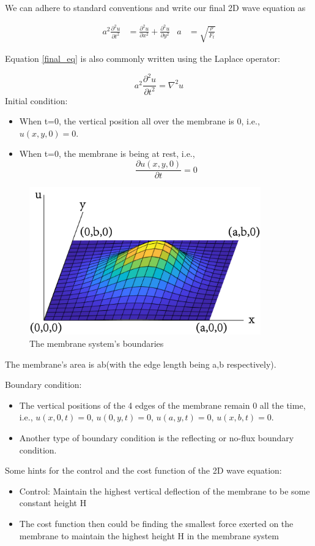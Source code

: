 \noindent We can adhere to standard conventions and write our final 2D wave equation as 


\begin{align}
a^2 \frac{\partial^2u}{\partial t^2} &= \frac{\partial^2 u}{\partial x^2} + \frac{\partial^2 u}{\partial y^2} & a &= \sqrt{\frac{\rho}{F_t}}
\label{final_eq}
\end{align}

\noindent Equation \ref{final_eq} is also commonly written using the Laplace operator:

\begin{equation}
a^2 \frac{\partial^2u}{\partial t^2} = \nabla^2 u
\end{equation}
\noindent Initial condition:
\begin{itemize}
	\item When t=0, the vertical position all over the membrane is 0, i.e., $u(x,y,0)=0$.
    \item When t=0, the membrane is being at rest, i.e., \begin{equation} \frac{\partial u(x,y,0)}{\partial t}=0
\end{equation}
\end{itemize}
\begin{figure}[htb]
	\centering
	\includegraphics[width=10cm]{Figures/2D_waves_boundary_conditions.png}       
	\caption{The membrane system's boundaries}
	\label{2D_waves_boundary_conditions.fig}
\end{figure}
\noindent The membrane's area is ab(with the edge length being a,b respectively).

\noindent Boundary condition: 
\begin{itemize}
	\item The vertical positions of the 4 edges of the membrane remain 0 all the time, i.e., $u(x,0,t)=0$, $u(0,y,t)=0$, $u(a,y,t)=0$, $u(x,b,t)=0$.
	\item Another type of boundary condition is the reflecting or no-flux boundary condition.
\end{itemize}
\noindent Some hints for the control and the cost function of the 2D wave equation:
\begin{itemize}
	\item Control: Maintain the highest vertical deflection of the membrane to be some constant height H   
    \item The cost function then could be finding the smallest force exerted on the membrane to maintain the highest height H in the membrane system
    
\end{itemize}